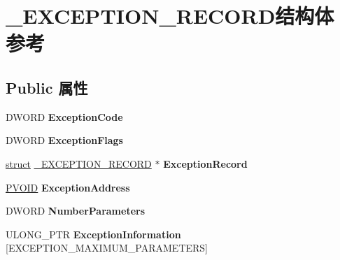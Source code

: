 \hypertarget{struct___e_x_c_e_p_t_i_o_n___r_e_c_o_r_d}{}\section{\+\_\+\+E\+X\+C\+E\+P\+T\+I\+O\+N\+\_\+\+R\+E\+C\+O\+R\+D结构体 参考}
\label{struct___e_x_c_e_p_t_i_o_n___r_e_c_o_r_d}
\subsection*{Public 属性}
\begin{DoxyCompactItemize}
\item 
\mbox{\label{struct___e_x_c_e_p_t_i_o_n___r_e_c_o_r_d_a918545d37db4d803dcedb3ac7ca7bdad}} 
D\+W\+O\+RD {\bfseries Exception\+Code}
\item 
\mbox{\label{struct___e_x_c_e_p_t_i_o_n___r_e_c_o_r_d_a98f817e747c3862d7dfd44f149cabd08}} 
D\+W\+O\+RD {\bfseries Exception\+Flags}
\item 
\mbox{\label{struct___e_x_c_e_p_t_i_o_n___r_e_c_o_r_d_a0aa336924e4441ec495a30a0b51a9f1e}} 
\hyperlink{interfacestruct}{struct} \hyperlink{struct___e_x_c_e_p_t_i_o_n___r_e_c_o_r_d}{\+\_\+\+E\+X\+C\+E\+P\+T\+I\+O\+N\+\_\+\+R\+E\+C\+O\+RD} $\ast$ {\bfseries Exception\+Record}
\item 
\mbox{\label{struct___e_x_c_e_p_t_i_o_n___r_e_c_o_r_d_ade4c61d2a32191841e1d4da263df0124}} 
\hyperlink{interfacevoid}{P\+V\+O\+ID} {\bfseries Exception\+Address}
\item 
\mbox{\label{struct___e_x_c_e_p_t_i_o_n___r_e_c_o_r_d_a94a780ff9fb20f90f65e5292d23dbe3e}} 
D\+W\+O\+RD {\bfseries Number\+Parameters}
\item 
\mbox{\label{struct___e_x_c_e_p_t_i_o_n___r_e_c_o_r_d_aac36f0ec59ee4a3c79a27ca4e2b8c92e}} 
U\+L\+O\+N\+G\+\_\+\+P\+TR {\bfseries Exception\+Information} \mbox{[}E\+X\+C\+E\+P\+T\+I\+O\+N\+\_\+\+M\+A\+X\+I\+M\+U\+M\+\_\+\+P\+A\+R\+A\+M\+E\+T\+E\+RS\mbox{]}

\end{DoxyCompactItemize}
